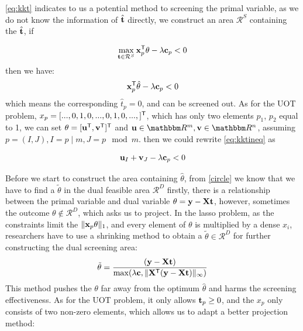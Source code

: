 \ref{eq:kkt} indicates to us a potential method to screening the primal variable, as we do not know the information of $\hat{\mathbf t}$ directly, we construct an area $\mathcal{R}^{S}$ containing the $\hat{\mathbf t}$, if

\begin{equation}
\max_{\mathbf t \in \mathcal{R}^S} \mathbf{x}_p^{\mathsf T}\theta -\lambda \mathbf c_p < 0
\end{equation}
then we have:
 \begin{equation}
 \mathbf{x}_p^{\mathsf T}\hat{\theta} -\lambda \mathbf c_p < 0 
 \label{eq:kktineq}
\end{equation}
which means the corresponding $\hat{t}_p = 0$, and can be screened out.
As for the UOT problem, $x_p = [...,0,1,0,...,0,1,0,...,]^{\mathsf T}$, which has only two elements $p_1$, $p_2$ equal to 1, we can set $\theta = [\mathbf u^{\mathsf T},\mathbf v^{\mathsf T}]^{\mathsf T}$ and $\vu\in\R^{m}, \vv\in\R^{n}$, assuming $p=(I,J), I = p \mid m, J = p \mod m$. then we could rewrite \ref{eq:kktineq} as 

 \begin{equation}
\mathbf u_{I} + \mathbf v_{J}-\lambda \mathbf c_p < 0
\end{equation}

Before we start to construct the area containing $\hat{\theta}$, from \ref{circle} we know that we have to find a $\tilde{\theta}$ in the dual feasible area $\mathcal{R}^{D}$ firstly, there is a relationship between the primal variable and dual variable $\theta = \mathbf y - \mathbf{X}\mathbf t$, however, sometimes the outcome $\theta \notin \mathcal{R}^{D}$, which asks us to project. In the lasso problem, as the constraints limit the $\|\mathbf{x}_p \theta\|_1$, and every element of $\theta$ is multiplied by a dense $x_i$, researchers have to use a shrinking method to obtain a $\tilde{\theta} \in \mathcal{R}^{D}$ for further constructing the dual screening area: 
\begin{equation}
\tilde{\theta} = \frac{(\mathbf y - \mathbf{X} \mathbf t)}{\max(\lambda \mathbf c, \|\mathbf{X}^{\mathsf T}(\mathbf y-\mathbf{X}\mathbf t)\|_{\infty})}
\end{equation}
This method pushes the $\theta$ far away from the optimum $\hat{\theta}$ and harms the screening effectiveness. As for the UOT problem, it only allows $\mathbf t_p \geq 0$, and the $x_p$ only consists of two non-zero elements, which allows us to adapt a better projection method:

